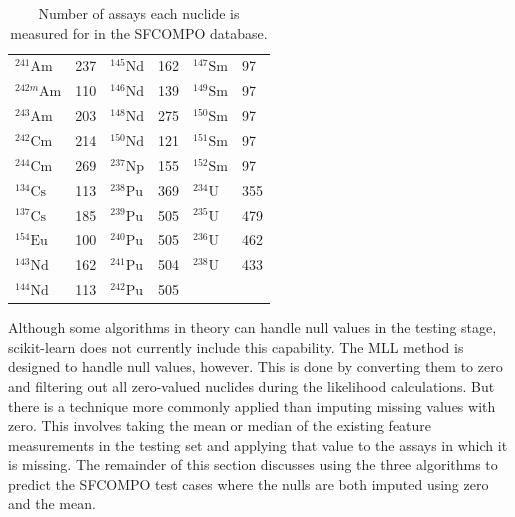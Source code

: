 \begin{table}[!htb]
  \centering
  \begin{tabular}{>{\raggedleft}m{0.6in}
                                m{0.4in}
                  >{\raggedleft}m{0.6in}
                                m{0.4in}
                  >{\raggedleft}m{0.6in}
                                m{0.4in}}
    \toprule
    \rowcolor[gray]{0.88} ${}^{241}\text{Am}$  & 237 & ${}^{145}\text{Nd}$ & 162 & ${}^{147}\text{Sm}$ & 97  \\  
    \rowcolor[gray]{0.95} ${}^{242m}\text{Am}$ & 110 & ${}^{146}\text{Nd}$ & 139 & ${}^{149}\text{Sm}$ & 97  \\ 
    \rowcolor[gray]{0.88} ${}^{243}\text{Am}$  & 203 & ${}^{148}\text{Nd}$ & 275 & ${}^{150}\text{Sm}$ & 97  \\ 
    \rowcolor[gray]{0.95} ${}^{242}\text{Cm}$  & 214 & ${}^{150}\text{Nd}$ & 121 & ${}^{151}\text{Sm}$ & 97  \\ 
    \rowcolor[gray]{0.88} ${}^{244}\text{Cm}$  & 269 & ${}^{237}\text{Np}$ & 155 & ${}^{152}\text{Sm}$ & 97  \\ 
    \rowcolor[gray]{0.95} ${}^{134}\text{Cs}$  & 113 & ${}^{238}\text{Pu}$ & 369 & ${}^{234}\text{U}$  & 355 \\ 
    \rowcolor[gray]{0.88} ${}^{137}\text{Cs}$  & 185 & ${}^{239}\text{Pu}$ & 505 & ${}^{235}\text{U}$  & 479 \\ 
    \rowcolor[gray]{0.95} ${}^{154}\text{Eu}$  & 100 & ${}^{240}\text{Pu}$ & 505 & ${}^{236}\text{U}$  & 462 \\ 
    \rowcolor[gray]{0.88} ${}^{143}\text{Nd}$  & 162 & ${}^{241}\text{Pu}$ & 504 & ${}^{238}\text{U}$  & 433 \\ 
    \rowcolor[gray]{0.95} ${}^{144}\text{Nd}$  & 113 & ${}^{242}\text{Pu}$ & 505 &       &     \\ \bottomrule
  \end{tabular}
  \caption[Number of assays each nuclide is measured for in \acrshort{SFCOMPO}]
          {Number of assays each nuclide is measured for in the 
           \acrshort{SFCOMPO} database.}
  \label{tbl:missing}
\end{table}

Although some algorithms in theory can handle null values in the testing stage,
scikit-learn does not currently include this capability. The \gls{MLL} method
is designed to handle null values, however. This is done by converting them to
zero and filtering out all zero-valued nuclides during the likelihood
calculations. But there is a technique more commonly applied than imputing
missing values with zero. This involves taking the mean or median of the
existing feature measurements in the testing set  and
applying that value to the assays in which it is missing.  The remainder of
this section discusses using the three algorithms to predict the \gls{SFCOMPO}
test cases where the nulls are both imputed using zero and the mean.

